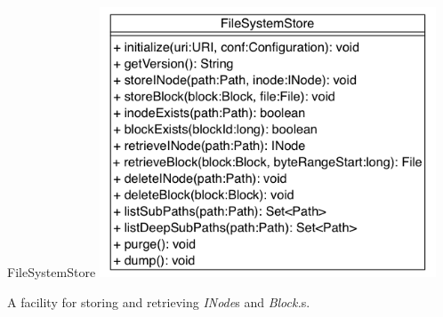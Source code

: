 \begin{XeClass}{FileSystemStore}
\includegraphics[width=10cm]{cdig/FileSystemStore.png}
     
 A facility for storing and retrieving \emph{INode}s and \emph{Block.}s.

\end{XeClass}
